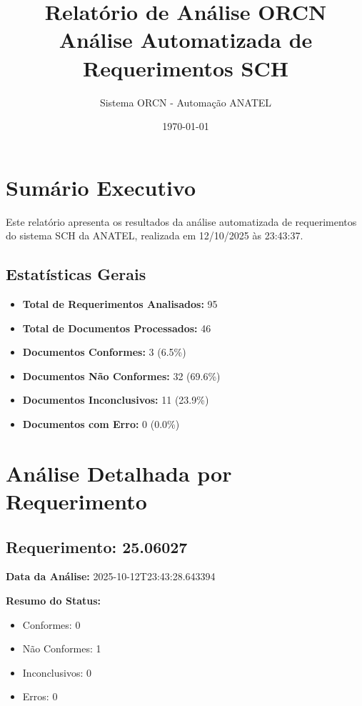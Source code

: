 \documentclass[12pt,a4paper]{article}
\title{\Huge\textbf{Relatório de Análise ORCN}\\
\Large Análise Automatizada de Requerimentos SCH}
\author{Sistema ORCN - Automação ANATEL}
\date{\today}
\begin{document}
\maketitle
\newpage

\tableofcontents
\newpage

\section{Sum\'ario Executivo}

Este relat\'orio apresenta os resultados da an\'alise automatizada de requerimentos do sistema SCH da ANATEL, 
realizada em 12/10/2025 às 23:43:37.

\subsection{Estat\'isticas Gerais}

\begin{itemize}
    \item \textbf{Total de Requerimentos Analisados:} 95
    \item \textbf{Total de Documentos Processados:} 46
    \item \textbf{Documentos Conformes:} 3 (6.5\%)
    \item \textbf{Documentos N\~ao Conformes:} 32 (69.6\%)
    \item \textbf{Documentos Inconclusivos:} 11 (23.9\%)
    \item \textbf{Documentos com Erro:} 0 (0.0\%)
\end{itemize}

\newpage

\section{An\'alise Detalhada por Requerimento}


\subsection{Requerimento: 25.06027}

\textbf{Data da Análise:} 2025-10-12T23:43:28.643394

\textbf{Resumo do Status:}
\begin{itemize}
    \item Conformes: 0
    \item Não Conformes: 1
    \item Inconclusivos: 0
    \item Erros: 0
\end{itemize}
\end{document}
